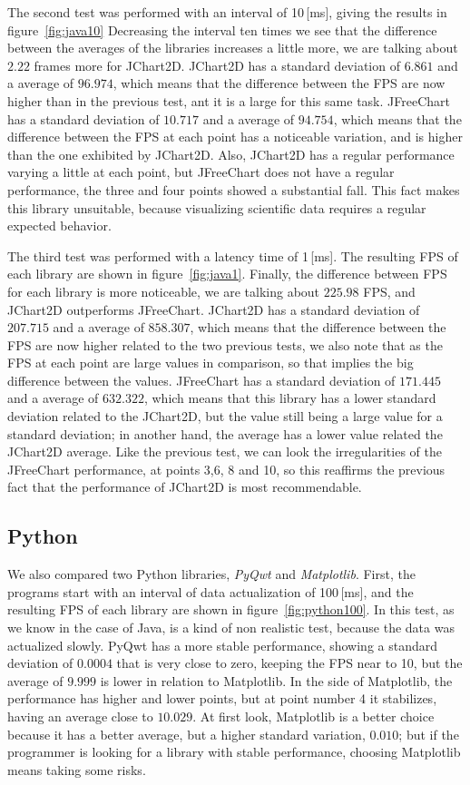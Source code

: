 The second test was performed with an interval of 10\,[ms],
giving the results in figure~\ref{fig:java10}
Decreasing the interval ten times
we see that the difference between the averages of the libraries
increases a little more, we are talking about $2.22$ frames more
for JChart2D.
JChart2D has a standard deviation of $6.861$ and a average of $96.974$, which means that
the difference between the FPS are now higher than in the previous test,
ant it is a large for this same task.
JFreeChart has a standard deviation of $10.717$ and a average of $94.754$, which means that
the difference between the FPS at each point has a noticeable variation, and is higher than the one exhibited by JChart2D.
Also, JChart2D has a regular performance varying a little at each
point, but JFreeChart does not have a regular performance, the three
and four points showed a substantial fall. This fact makes this library unsuitable,
because visualizing scientific data requires a regular
expected behavior.

The third test was performed with a latency time of 1\,[ms].
The resulting FPS of each library are shown in figure~\ref{fig:java1}.
Finally, the difference between FPS for each library
is more noticeable, we are talking about $225.98$ FPS,
and JChart2D outperforms JFreeChart.
JChart2D has a standard deviation of $207.715$ and a average of $858.307$, which means that
the difference between the FPS are now higher related to the two previous tests,
we also note that as the FPS at each point are large values in comparison, so that implies
the big difference between the values.
JFreeChart has a standard deviation of $171.445$ and a average of $632.322$, which means that
this library has a lower standard deviation related to the JChart2D, but the value still being
a large value for a standard deviation; in another hand, the average has a lower value related
the JChart2D average.
Like the previous test, we can look the irregularities of the
JFreeChart performance, at points 3,6, 8 and 10,
so this reaffirms the previous fact that the performance
of JChart2D is most recommendable.

\subsection{Python}

We also compared two Python libraries,
\emph{PyQwt} and \emph{Matplotlib}.
First, the programs start with an interval of data actualization of 100\,[ms],
and the resulting FPS of each library are shown in figure~\ref{fig:python100}.
In this test, as we know in the case of Java, is a kind of non realistic test,
because the data was actualized slowly.
PyQwt has a more stable performance, showing a standard deviation of $0.0004$ that is very close to zero,
keeping the FPS near to 10, but the average of $9.999$ is lower in relation to Matplotlib.
In the side of Matplotlib, the performance has higher and lower points,
but at point number 4 it stabilizes, having an average close to $10.029$.
At first look, Matplotlib is a better choice because it has a better average, but a higher standard variation, $0.010$;
but if the programmer is looking for a library with stable performance,
choosing Matplotlib means taking some risks.

